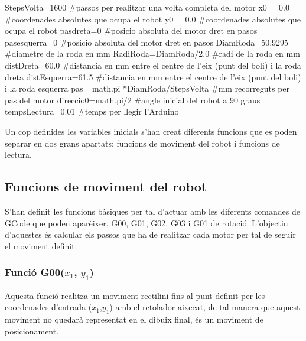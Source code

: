 \begin{python}
	StepsVolta=1600  #passos per realitzar una volta completa del motor
	x0 = 0.0  #coordenades absolutes que ocupa el robot
	y0 = 0.0  #coordenades absolutes que ocupa el robot
	pasdreta=0  #posicio absoluta del motor dret en pasos
	pasesquerra=0  #posicio absoluta del motor dret en pasos
	DiamRoda=50.9295  #diametre de la roda en mm
	RadiRoda=DiamRoda/2.0  #radi de la roda en mm
	distDreta=60.0  #distancia en mm entre el centre de l'eix (punt del boli) i la roda dreta
	distEsquerra=61.5  #distancia en mm entre el centre de l'eix (punt del boli) i la roda esquerra
	pas= math.pi *DiamRoda/StepsVolta  #mm recorreguts per pas del motor
	direccio0=math.pi/2  #angle inicial del robot a 90 graus
	tempsLectura=0.01  #temps per llegir l'Arduino 
\end{python}


Un cop definides les variables inicials s’han creat diferents funcions que es poden separar en dos grans apartats: funcions de moviment del robot i funcions de lectura. 

\subsection{Funcions de moviment del robot}
S’han definit les funcions bàsiques per tal d’actuar amb les diferents comandes de GCode que poden aparèixer, G00, G01, G02, G03 i G01 de rotació. L’objectiu d’aquestes és calcular els passos que ha de realitzar cada motor per tal de seguir el moviment definit. 

\subsubsection{Funció G00($x_{1}$, $y_{1}$)}

Aquesta funció realitza un moviment rectilini fins al punt definit per les coordenades d’entrada ($x_{1}$,$y_{1}$) amb el retolador aixecat, de tal manera que aquest moviment no quedarà representat en el dibuix final, és un moviment de posicionament.

